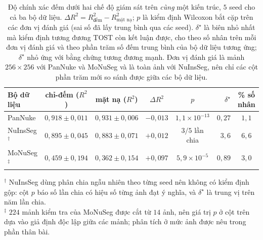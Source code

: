 \documentclass[preprint,12pt]{elsarticle}
\begin{document}
\begin{table}[!htbp]
\centering
\caption{Độ chính xác đếm dưới hai chế độ giám sát trên \emph{cùng} một kiến trúc, $5$ seed cho cả ba bộ dữ liệu.
$\Delta R^2 = R^2_{\text{đếm}} - R^2_{\text{mặt nạ}}$; $p$ là kiểm định Wilcoxon bắt cặp trên các đơn vị đánh giá
(sai số đã lấy trung bình qua các seed). $\delta^\star$ là biên nhỏ nhất mà kiểm định tương đương TOST còn kết
luận được, cho theo số nhân trên mỗi đơn vị đánh giá và theo phần trăm số đếm trung bình của bộ dữ liệu tương ứng;
$\delta^\star$ nhỏ ứng với bằng chứng tương đương mạnh. Đơn vị đánh giá là mảnh $256\times256$ với PanNuke và
MoNuSeg và là toàn ảnh với NuInsSeg, nên chỉ các cột phần trăm mới so sánh được giữa các bộ dữ
liệu.}\label{tab:parity}
\small
\setlength{\tabcolsep}{4pt}
\begin{tabular}{@{}lccccrc@{}}
\toprule
Bộ dữ liệu & chỉ-đếm ($R^2$) & mặt nạ ($R^2$) & $\Delta R^2$ & $p$ & $\delta^\star$ & \% số nhân \\
\midrule
PanNuke & $0{,}918\pm0{,}011$ & $0{,}931\pm0{,}006$ & $-0{,}013$ & $1{,}1{\times}10^{-13}$ & $0{,}27$ & $1{,}1$ \\
NuInsSeg$^{\dagger}$ & $0{,}895\pm0{,}045$ & $0{,}883\pm0{,}071$ & $+0{,}012$ & $3/5$ lần chia & $3{,}6$ & $6{,}6$ \\
MoNuSeg$^{\ddagger}$ & $0{,}459\pm0{,}194$ & $0{,}362\pm0{,}154$ & $+0{,}097$ & $5{,}9{\times}10^{-5}$ & $0{,}89$ & $3{,}0$ \\
\bottomrule
\end{tabular}

\vspace{4pt}
\begin{minipage}{\textwidth}\footnotesize
$^{\dagger}$ NuInsSeg dùng phân chia ngẫu nhiên theo từng seed nên không có kiểm định gộp: cột $p$ báo số lần chia
có hiệu số từng ảnh đạt ý nghĩa, và $\delta^\star$ là trung vị trên năm lần chia.\\
$^{\ddagger}$ $224$ mảnh kiểm tra của MoNuSeg được cắt từ $14$ ảnh, nên giá trị $p$ ở cột trên dựa vào giả định
độc lập giữa các mảnh; phân tích ở mức ảnh được nêu trong phần thân bài.
\end{minipage}
\end{table}
\end{document}
